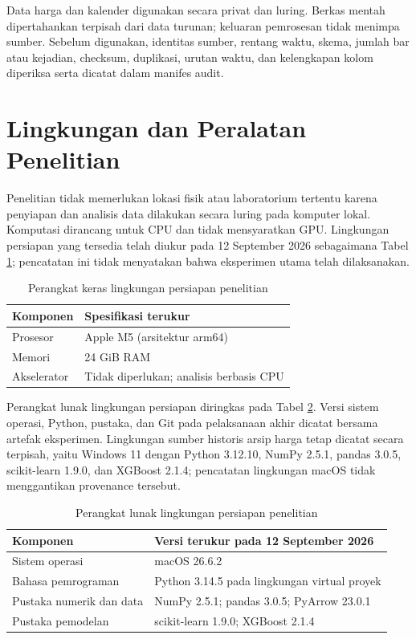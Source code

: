 Data harga dan kalender digunakan secara privat dan luring. Berkas mentah dipertahankan terpisah dari data turunan; keluaran pemrosesan tidak menimpa sumber. Sebelum digunakan, identitas sumber, rentang waktu, skema, jumlah bar atau kejadian, checksum, duplikasi, urutan waktu, dan kelengkapan kolom diperiksa serta dicatat dalam manifes audit.

\section{Lingkungan dan Peralatan Penelitian}

Penelitian tidak memerlukan lokasi fisik atau laboratorium tertentu karena penyiapan dan analisis data dilakukan secara luring pada komputer lokal. Komputasi dirancang untuk CPU dan tidak mensyaratkan GPU. Lingkungan persiapan yang tersedia telah diukur pada 12 September 2026 sebagaimana Tabel \ref{tab:perangkat-keras}; pencatatan ini tidak menyatakan bahwa eksperimen utama telah dilaksanakan.

\begin{table}[htbp]
    \centering
    \caption{Perangkat keras lingkungan persiapan penelitian}
    \label{tab:perangkat-keras}
    \begin{tabular}{ll}
        \hline
        Komponen & Spesifikasi terukur \\
        \hline
        Prosesor & Apple M5 (arsitektur arm64) \\
        Memori & 24 GiB RAM \\
        Akselerator & Tidak diperlukan; analisis berbasis CPU \\
        \hline
    \end{tabular}
\end{table}

Perangkat lunak lingkungan persiapan diringkas pada Tabel \ref{tab:perangkat-lunak}. Versi sistem operasi, Python, pustaka, dan Git pada pelaksanaan akhir dicatat bersama artefak eksperimen. Lingkungan sumber historis arsip harga tetap dicatat secara terpisah, yaitu Windows 11 dengan Python 3.12.10, NumPy 2.5.1, pandas 3.0.5, scikit-learn 1.9.0, dan XGBoost 2.1.4; pencatatan lingkungan macOS tidak menggantikan provenance tersebut.

\begin{table}[htbp]
    \centering
    \caption{Perangkat lunak lingkungan persiapan penelitian}
    \label{tab:perangkat-lunak}
    \begin{tabular}{ll}
        \hline
        Komponen & Versi terukur pada 12 September 2026 \\
        \hline
        Sistem operasi & macOS 26.6.2 \\
        Bahasa pemrograman & Python 3.14.5 pada lingkungan virtual proyek \\
        Pustaka numerik dan data & NumPy 2.5.1; pandas 3.0.5; PyArrow 23.0.1 \\
        Pustaka pemodelan & scikit-learn 1.9.0; XGBoost 2.1.4 \\
        \hline
    \end{tabular}
\end{table}

